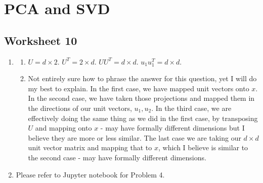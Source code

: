 \documentclass[12pt]{article}
\theoremstyle{plain}
\theoremstyle{definition}
\numberwithin{equation}{theorem}
\begin{document}
\section{PCA and SVD}
\subsection{Worksheet 10}
\begin{enumerate}
\addtocounter{enumi}{2}
\item
	\begin{enumerate}
	\item $U = d \times 2$. $U^{T} = 2 \times d$.  $UU^{T} = d \times d$.  $u_{1}u_{1}^{T} = d \times d$.
	\item Not entirely sure how to phrase the answer for this question, yet I will do my best to explain. In the first case, we have mapped unit vectors onto $x$. In the second case, we have taken those projections and mapped them in the directions of our unit vectors,  $u_{1}, u_{2}$. In the third case, we are effectively doing the same thing as we did in the first case, by transposing $U$ and mapping onto $x$ - may have formally different dimensions but I believe they are more or less similar. The last case we are taking our $d \times d$ unit vector matrix and mapping that to $x$, which I believe is similar to the second case - may have formally different dimensions.
	\end{enumerate}
\item Please refer to Jupyter notebook for Problem 4.

\end{enumerate}
\bigskip
\end{document}
